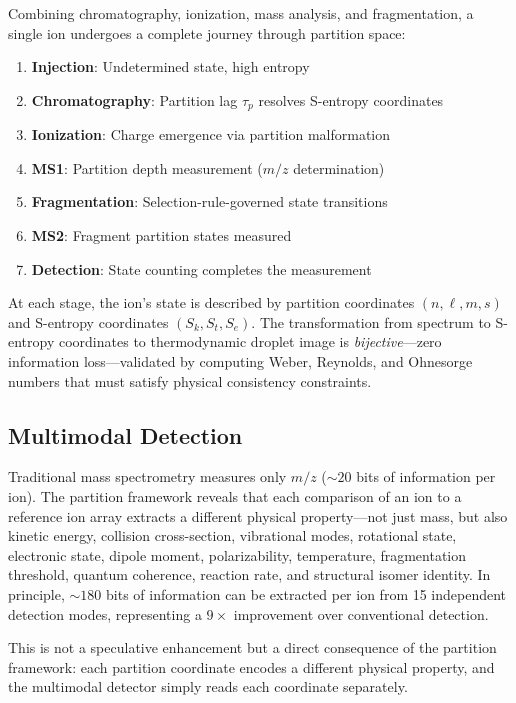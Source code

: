 \documentclass[twocolumn,10pt,a4paper]{article}
\theoremstyle{definition}
\theoremstyle{remark}
\newcommand{\taup}{\tau_p}
\begin{document}
Combining chromatography, ionization, mass analysis, and fragmentation, a single ion undergoes a complete journey through partition space:
\begin{enumerate}[label=\arabic*., nosep]
    \item \textbf{Injection}: Undetermined state, high entropy
    \item \textbf{Chromatography}: Partition lag $\taup$ resolves S-entropy coordinates
    \item \textbf{Ionization}: Charge emergence via partition malformation
    \item \textbf{MS1}: Partition depth measurement ($m/z$ determination)
    \item \textbf{Fragmentation}: Selection-rule-governed state transitions
    \item \textbf{MS2}: Fragment partition states measured
    \item \textbf{Detection}: State counting completes the measurement
\end{enumerate}

At each stage, the ion's state is described by partition coordinates $(n, \ell, m, s)$ and S-entropy coordinates $(S_k, S_t, S_e)$. The transformation from spectrum to S-entropy coordinates to thermodynamic droplet image is \emph{bijective}---zero information loss---validated by computing Weber, Reynolds, and Ohnesorge numbers that must satisfy physical consistency constraints.

\subsection{Multimodal Detection}

Traditional mass spectrometry measures only $m/z$ ($\sim 20$ bits of information per ion). The partition framework reveals that each comparison of an ion to a reference ion array extracts a different physical property---not just mass, but also kinetic energy, collision cross-section, vibrational modes, rotational state, electronic state, dipole moment, polarizability, temperature, fragmentation threshold, quantum coherence, reaction rate, and structural isomer identity. In principle, $\sim 180$ bits of information can be extracted per ion from 15 independent detection modes, representing a $9\times$ improvement over conventional detection.

This is not a speculative enhancement but a direct consequence of the partition framework: each partition coordinate encodes a different physical property, and the multimodal detector simply reads each coordinate separately.
\end{document}
